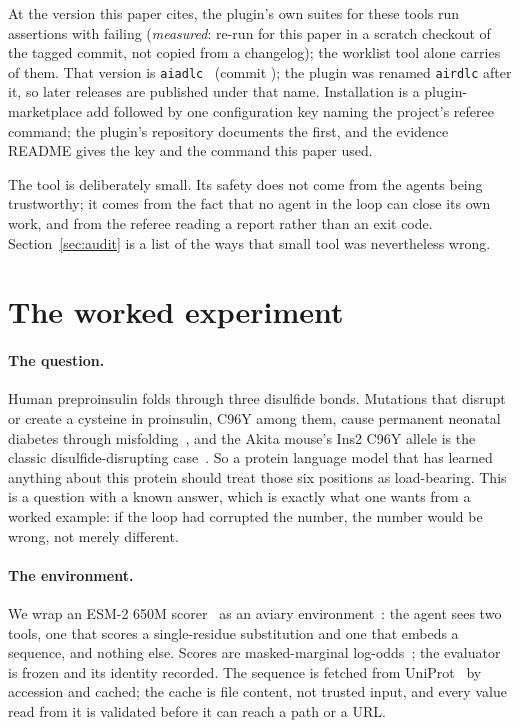 \documentclass[10pt]{article}
\begin{document}
At the version this paper cites, the plugin's own suites for these tools run \claimplugintests{} assertions with \claimpluginfail{} failing (\emph{measured}: re-run for this paper in a scratch checkout of the tagged commit, not copied from a changelog); the worklist tool alone carries \claimregtests{} of them. That version is \texttt{aiadlc}~\claimpluginver{} (commit \texttt{\claimplugincommit{}}); the plugin was renamed \texttt{airdlc} after it, so later releases are published under that name. Installation is a plugin-marketplace add followed by one configuration key naming the project's referee command; the plugin's repository documents the first, and the evidence README gives the key and the command this paper used.

The tool is deliberately small. Its safety does not come from the agents being trustworthy; it comes from the fact that no agent in the loop can close its own work, and from the referee reading a report rather than an exit code. Section~\ref{sec:audit} is a list of the ways that small tool was nevertheless wrong.

\section{The worked experiment}\label{sec:biosim}

\paragraph{The question.} Human preproinsulin folds through three disulfide bonds. Mutations that disrupt or create a cysteine in proinsulin, C96Y among them, cause permanent neonatal diabetes through misfolding~\cite{stoy2007insulin}, and the Akita mouse's Ins2 C96Y allele is the classic disulfide-disrupting case~\cite{wang1999akita}. So a protein language model that has learned anything about this protein should treat those six positions as load-bearing. This is a question with a known answer, which is exactly what one wants from a worked example: if the loop had corrupted the number, the number would be wrong, not merely different.

\paragraph{The environment.} We wrap an ESM-2 650M scorer~\cite{lin2023esm} as an aviary environment~\cite{narayanan2024aviary}: the agent sees two tools, one that scores a single-residue substitution and one that embeds a sequence, and nothing else. Scores are masked-marginal log-odds~\cite{meier2021zeroshot}; the evaluator is frozen and its identity recorded. The sequence is fetched from UniProt~\cite{uniprot2023} by accession and cached; the cache is file content, not trusted input, and every value read from it is validated before it can reach a path or a URL.
\end{document}
